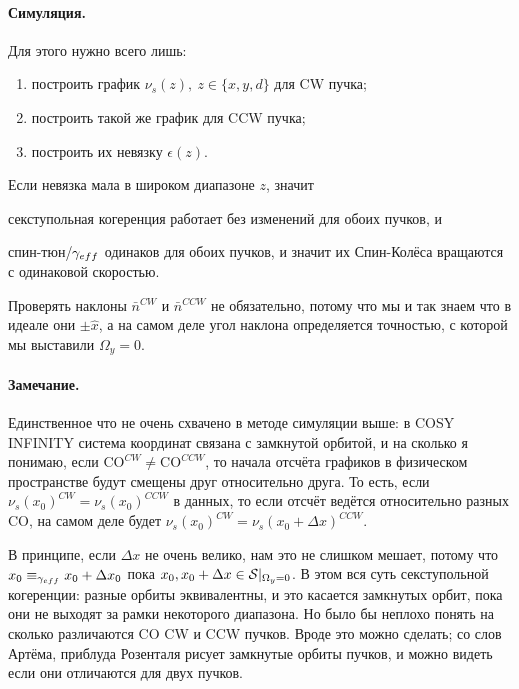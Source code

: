 \documentclass[a4paper,14pt]{article}
\newcommand{\W}{\Omega}
\newcommand{\nbar}{\bar n}
\newcommand{\CO}{\mathrm{CO}}
\begin{document}
\paragraph{Симуляция.}
Для этого нужно всего лишь:
\begin{enumerate}
\item построить график $\nu_s(z),~z\in\{x,y,d\}$ для CW пучка;
\item построить такой же график для CCW пучка;
\item построить их невязку $\epsilon(z)$.
\end{enumerate}

Если невязка мала в широком диапазоне $z$, значит
\begin{inparaenum}[1)]
\item секступольная когеренция работает без изменений для обоих пучков, и
\item спин-тюн/$\g*$ одинаков для обоих пучков, и значит их Спин-Колёса вращаются с одинаковой скоростью.
\end{inparaenum}

Проверять наклоны $\nbar^{CW}$ и $\nbar^{CCW}$ не обязательно, потому что мы и так знаем что
в идеале они $\pm\hat x$, а на самом деле угол наклона определяется точностью, с которой мы выставили $\W_y=0$.

\paragraph{Замечание.}
Единственное что не очень схвачено в методе симуляции выше: в COSY INFINITY система координат связана с
замкнутой орбитой, и на сколько я понимаю, если $\CO^{CW}\neq \CO^{CCW}$, то начала отсчёта графиков в
физическом пространстве будут смещены друг относительно друга. То есть, если $\nu_s(x_0)^{CW} = \nu_s(x_0)^{CCW}$
в данных, то если отсчёт ведётся относительно разных $\CO$, на самом деле будет
$\nu_s(x_0)^{CW} = \nu_s(x_0+\Delta x)^{CCW}$.

В принципе, если $\Delta x$ не очень велико, нам это не слишком мешает, потому что
$x_0\equiv_{\g*} x_0+\Delta x_0$ пока $x_0, x_0+\Delta x \in \Stab*$. В этом вся суть
секступольной когеренции: разные орбиты эквивалентны, и это касается замкнутых орбит, пока они не выходят
за рамки некоторого диапазона. Но было бы неплохо понять
на сколько различаются $\CO$ CW и CCW пучков. Вроде это можно сделать; со слов Артёма, приблуда Розенталя рисует
замкнутые орбиты пучков, и можно видеть если они отличаются для двух пучков.
\end{document}
